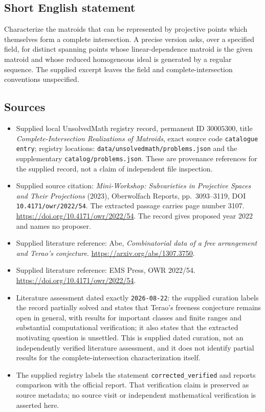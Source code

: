 \documentclass[11pt]{article}
\begin{document}
\subsection{Short English statement}
Characterize the matroids that can be represented by projective points which themselves form a complete intersection. A precise version asks, over a specified field, for distinct spanning points whose linear-dependence matroid is the given matroid and whose reduced homogeneous ideal is generated by a regular sequence. The supplied excerpt leaves the field and complete-intersection conventions unspecified.
\subsection{Sources}
\begin{itemize}
\item Supplied local UnsolvedMath registry record, permanent ID \(30005300\), title \emph{Complete-Intersection Realizations of Matroids}, exact source code \texttt{catalogue entry}; registry locations: \texttt{data/unsolvedmath/problems.json} and the supplementary \texttt{catalog/problems.json}. These are provenance references for the supplied record, not a claim of independent file inspection.
\item Supplied source citation: \emph{Mini-Workshop: Subvarieties in Projective Spaces and Their Projections} (2023), Oberwolfach Reports, pp.\ 3093--3119, DOI \texttt{10.4171/owr/2022/54}. The extracted passage carries page number 3107. \url{https://doi.org/10.4171/owr/2022/54}. The record gives proposed year 2022 and names no proposer.
\item Supplied literature reference: Abe, \emph{Combinatorial data of a free arrangement and Terao's conjecture}. \url{https://arxiv.org/abs/1307.3750}.
\item Supplied literature reference: EMS Press, OWR 2022/54. \url{https://doi.org/10.4171/owr/2022/54}.
\item Literature assessment dated exactly \texttt{2026-08-22}: the supplied curation labels the record partially solved and states that Terao's freeness conjecture remains open in general, with results for important classes and finite ranges and substantial computational verification; it also states that the extracted motivating question is unsettled. This is supplied dated curation, not an independently verified literature assessment, and it does not identify partial results for the complete-intersection characterization itself.
\item The supplied registry labels the statement \texttt{corrected\_verified} and reports comparison with the official report. That verification claim is preserved as source metadata; no source visit or independent mathematical verification is asserted here.
\end{itemize}
\end{document}
